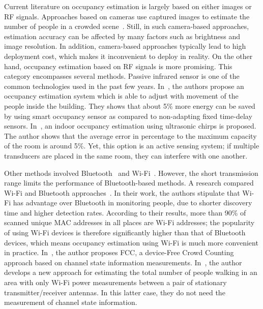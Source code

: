 Current literature on occupancy estimation is largely based on either images or RF signals.
Approaches based on cameras use captured images to estimate the number of people in a crowded scene~\cite{Ma_2013_CVPR,Pe_count,li2008estimating}.
Still, in such camera-based approaches, estimation accuracy can be affected by many factors such as brightness and image resolution.
In addition, camera-based approaches typically lead to high deployment cost, which makes it inconvenient to deploy in reality.
On the other hand, occupancy estimation based on RF signals is more promising.
This category encompasses several methods. 
Passive infrared sensor is one of the common technologies used in the past few years.
In~\cite{Garg200081}, the authors propose an occupancy estimation system which is able to adjust with movement of the people inside the building.
They shows that about 5\% more energy can be saved by using smart occupancy sensor as compared to non-adapting fixed time-delay sensors.
In~\cite{Shih:2015:OEU:2735960.2735969}, an indoor occupancy estimation using ultrasonic chirps is proposed.
The author shows that the average error in percentage to the maximum capacity of the room is around 5\%.
Yet, this option is an active sensing system; if multiple transducers are placed in the same room, they can interfere with one another.

Other methods involved Bluetooth~\cite{B_ad_hoc} and Wi-Fi~\cite{W_power}.
However, the short transmission range limits the performance of Bluetooth-based methods.
A research compared Wi-Fi and Bluetooth approaches~\cite{quteprints71808}.
In their work, the authors stipulate that Wi-Fi has advantage over Bluetooth in monitoring people, due to shorter discovery time and higher detection rates.
According to their results, more than 90\% of scanned unique MAC addresses in all places are Wi-Fi addresses; the popularity of using Wi-Fi devices is therefore significantly higher than that of Bluetooth devices, which means occupancy estimation using Wi-Fi is much more convenient in practice.
In~\cite{6847958}, the author proposes FCC, a device-Free Crowd Counting approach based on channel state information measurements.
In~\cite{7102673}, the author develops a new approach for estimating the total number of people walking in an area with only Wi-Fi power measurements between a pair of stationary transmitter/receiver antennas.
In this latter case, they do not need the measurement of channel state information.

